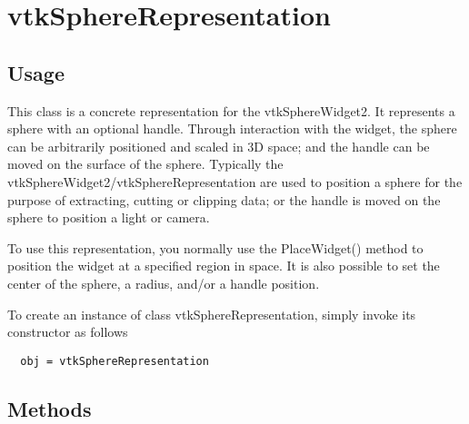 \section{vtkSphereRepresentation}

\subsection{Usage}

 This class is a concrete representation for the vtkSphereWidget2. It
 represents a sphere with an optional handle.  Through interaction with the
 widget, the sphere can be arbitrarily positioned and scaled in 3D space;
 and the handle can be moved on the surface of the sphere. Typically the
 vtkSphereWidget2/vtkSphereRepresentation are used to position a sphere for
 the purpose of extracting, cutting or clipping data; or the handle is
 moved on the sphere to position a light or camera.

 To use this representation, you normally use the PlaceWidget() method
 to position the widget at a specified region in space. It is also possible
 to set the center of the sphere, a radius, and/or a handle position.


To create an instance of class vtkSphereRepresentation, simply
invoke its constructor as follows
\begin{verbatim}
  obj = vtkSphereRepresentation
\end{verbatim}
\subsection{Methods}

